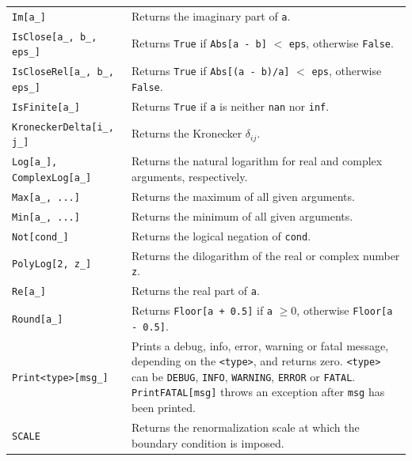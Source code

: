 \documentclass[final,3p,11pt,pdflatex]{elsarticle}
\newcommand{\code}[1]{\lstinline|#1|}  %
\begin{document}
\begin{table}[h!]
{\begin{tabularx}{1.05\textwidth}{lX}
    \code{Im[a_]} &
    Returns the imaginary part of \code{a}. \\

    \code{IsClose[a_, b_, eps_]} &
    Returns \code{True} if \code{Abs[a - b]} $<$ \code{eps}, otherwise \code{False}. \\

    \code{IsCloseRel[a_, b_, eps_]} &
    Returns \code{True} if \code{Abs[(a - b)/a]} $<$ \code{eps}, otherwise \code{False}. \\

    \code{IsFinite[a_]} &
    Returns \code{True} if \code{a} is neither \code{nan} nor \code{inf}. \\

    \code{KroneckerDelta[i_, j_]} &
    Returns the Kronecker $\delta_{ij}$. \\

    \code{Log[a_], ComplexLog[a_]} &
    Returns the natural logarithm for real and complex arguments, respectively. \\

    \code{Max[a_, ...]} &
    Returns the maximum of all given arguments. \\

    \code{Min[a_, ...]} &
    Returns the minimum of all given arguments. \\

    \code{Not[cond_]} &
    Returns the logical negation of \code{cond}. \\

    \code{PolyLog[2, z_]} &
    Returns the dilogarithm of the real or complex number \code{z}. \\

    \code{Re[a_]} &
    Returns the real part of \code{a}. \\

    \code{Round[a_]} &
    Returns \code{Floor[a + 0.5]} if \code{a} $\geq 0$, otherwise
    \code{Floor[a - 0.5]}. \\

    \code{Print<type>[msg_]} & Prints a debug, info, error, warning or
    fatal message, depending on the \code{<type>}, and returns zero.
    \code{<type>} can be \code{DEBUG}, \code{INFO}, \code{WARNING},
    \code{ERROR} or \code{FATAL}.  \code{PrintFATAL[msg]}
    throws an exception after \code{msg} has been printed.\\

    \code{SCALE} & Returns the renormalization scale at which
    the boundary condition is imposed. \\


\end{tabularx}}
\end{table}
\end{document}

